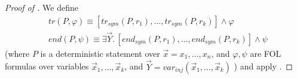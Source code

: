     \begin{proof}[Proof of ]
        We define
        \begin{align*}
            & \mathit{tr}(P, \varphi) \equiv [\mathit{tr}_{\mathit{sym}}(P, r_1),\ldots,\mathit{tr}_{\mathit{sym}}(P, r_k)] \land \varphi \\
            & \mathit{end}(P, \psi) \equiv \exists \vec{Y}.\, [\mathit{end}_{\mathit{sym}}(P, r_1),\ldots,\mathit{end}_{\mathit{sym}}(P, r_k)] \land \psi \,
        \end{align*}
        (where $P$ is a deterministic statement over $\vec{x} = x_1,\ldots,x_n$, 
        and $\varphi,\psi$ are FOL formulas over variables
        $\vec{x}_1,\ldots,\vec{x}_k$,
        and $\vec{Y} = \mathit{var}_{\mathit{inj}}(\vec{x}_1, \ldots, \vec{x}_k)$
        )
        and apply .
    \end{proof}

